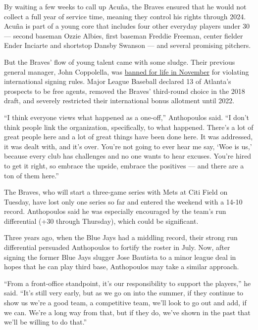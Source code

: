 By waiting a few weeks to call up Acuña, the Braves ensured that he
would not collect a full year of service time, meaning they control his
rights through 2024. Acuña is part of a young core that includes four
other everyday players under 30 --- second baseman Ozzie Albies, first
baseman Freddie Freeman, center fielder Ender Inciarte and shortstop
Dansby Swanson --- and several promising pitchers.

But the Braves' flow of young talent came with some sludge. Their
previous general manager, John Coppolella, was
\href{https://www.nytimes3xbfgragh.onion/2017/11/21/sports/baseball/mlb-atlanta-braves-ban.html}{banned
for life in November} for violating international signing rules. Major
League Baseball declared 13 of Atlanta's prospects to be free agents,
removed the Braves' third-round choice in the 2018 draft, and severely
restricted their international bonus allotment until 2022.

``I think everyone views what happened as a one-off,'' Anthopoulos said.
``I don't think people link the organization, specifically, to what
happened. There's a lot of great people here and a lot of great things
have been done here. It was addressed, it was dealt with, and it's over.
You're not going to ever hear me say, `Woe is us,' because every club
has challenges and no one wants to hear excuses. You're hired to get it
right, so embrace the upside, embrace the positives --- and there are a
ton of them here.''

The Braves, who will start a three-game series with Mets at Citi Field
on Tuesday, have lost only one series so far and entered the weekend
with a 14-10 record. Anthopoulos said he was especially encouraged by
the team's run differential (+30 through Thursday), which could be
significant.

Three years ago, when the Blue Jays had a middling record, their strong
run differential persuaded Anthopoulos to fortify the roster in July.
Now, after signing the former Blue Jays slugger Jose Bautista to a minor
league deal in hopes that he can play third base, Anthopoulos may take a
similar approach.

``From a front-office standpoint, it's our responsibility to support the
players,'' he said. ``It's still very early, but as we go on into the
summer, if they continue to show us we're a good team, a competitive
team, we'll look to go out and add, if we can. We're a long way from
that, but if they do, we've shown in the past that we'll be willing to
do that.''

